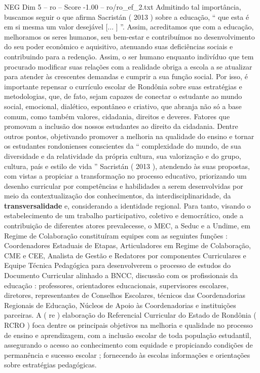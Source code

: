 \begin{textsample}{NEG Dim 5 – ro – Score -1.00 – ro/ro\_ef\_2.txt}
Admitindo tal importância, buscamos seguir o que afirma Sacristán ( 2013 ) sobre a educação, “ que esta é em si mesma um valor desejável [... ] ”.
Assim, acreditamos que com a educação, melhoramos os seres humanos, seu bem-estar e contribuímos no desenvolvimento do seu poder econômico e aquisitivo, atenuando suas deficiências sociais e contribuindo para a redenção.
Assim, o ser humano enquanto indivíduo que tem procurado modificar suas relações com a realidade obriga a escola a se atualizar para atender às crescentes demandas e cumprir a sua função social.
Por isso, é importante repensar o currículo escolar de Rondônia sobre suas estratégias e metodologias, que, de fato, sejam capazes de conectar o estudante ao mundo social, emocional, dialético, espontâneo e criativo, que abranja não só a base comum, como também valores, cidadania, direitos e deveres.
Fatores que promovam a inclusão dos nossos estudantes ao direito da cidadania.
Dentre outros pontos, objetivando promover a melhoria na qualidade do ensino e tornar os estudantes rondonienses conscientes da “ complexidade do mundo, de sua diversidade e da relatividade da própria cultura, sua valorização e do grupo, cultura, país e estilo de vida ” Sacristán ( 2013 ), atendendo às suas propostas, com vistas a propiciar a transformação no processo educativo, priorizando um desenho curricular por competências e habilidades a serem desenvolvidas por meio da contextualização dos conhecimentos, da interdisciplinaridade, da \textbf{transversalidade} e, considerando a identidade regional.
Para tanto, visando o estabelecimento de um trabalho participativo, coletivo e democrático, onde a contribuição de diferentes atores prevalecesse, o MEC, a Seduc e a Undime, em Regime de Colaboração constituíram equipes com as seguintes funções : Coordenadores Estaduais de Etapas, Articuladores em Regime de Colaboração, CME e CEE, Analista de Gestão e Redatores por componentes Curriculares e Equipe Técnica Pedagógica para desenvolverem o processo de estudos do Documento Curricular alinhado a BNCC, discussão com os profissionais da educação : professores, orientadores educacionais, supervisores escolares, diretores, representantes de Conselhos Escolares, técnicos das Coordenadorias Regionais de Educação, Núcleos de Apoio às Coordenadorias e instituições parceiras.
A ( re ) elaboração do Referencial Curricular do Estado de Rondônia ( RCRO ) foca dentre os principais objetivos na melhoria e qualidade no processo de ensino e aprendizagem, com a inclusão escolar de toda população estudantil, assegurando o acesso ao conhecimento com equidade e propiciando condições de permanência e sucesso escolar ; fornecendo às escolas informações e orientações sobre estratégias pedagógicas.

\end{textsample}
